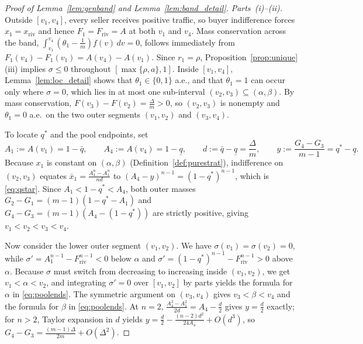 \documentclass[12pt]{article}
\theoremstyle{mystyle}
\theoremstyle{mystyle2}
\newcommand{\1}{\mathbf{1}}
\begin{document}
\begin{proof}[Proof of Lemma~\ref{lem:genband} and Lemma~\ref{lem:band_detail}]
\emph{Parts~(i)--(ii).} Outside $[v_1,v_4]$, every seller receives positive traffic, so buyer indifference forces $x_1=x_{\mathrm{riv}}$ and hence $F_1=F_{\mathrm{riv}}=A$ at both $v_1$ and $v_4$. Mass conservation across the band, $\int_{v_1}^{v_4}(\theta_1-\frac{1}{m})f(v)\,dv=0$, follows immediately from $F_1(v_4)-F_1(v_1)=A(v_4)-A(v_1)$. Since $r_1=\rho$, Proposition~\ref{prop:unique}(iii) implies $\sigma\le 0$ throughout $[\max\{\rho,a\},1]$. Inside $[v_1,v_4]$, Lemma~\ref{lem:loc_detail} shows that $\theta_1\in\{0,1\}$ a.e., and that $\theta_1=1$ can occur only where $\sigma=0$, which lies in at most one sub-interval $(v_2,v_3)\subseteq(\alpha,\beta)$. By mass conservation, $F(v_3)-F(v_2)=\frac{\Delta}{m}>0$, so $(v_2,v_3)$ is nonempty and $\theta_1=0$ a.e.\ on the two outer segments $(v_1,v_2)$ and $(v_3,v_4)$.

To locate $q^*$ and the pool endpoints, set
\[
A_1 := A(v_1) = 1-\bar q, \qquad A_4 := A(v_4) = 1-\underline q, \qquad d := \bar q-\underline q = \frac{\Delta}{m}, \qquad y := \frac{G_4-G_3}{m-1} = q^*-\underline q.
\]
Because $x_1$ is constant on $(\alpha,\beta)$ (Definition~\ref{def:purestrat}), indifference on $(v_2,v_3)$ equates $\bar x_1=\frac{A_4^n-A_1^n}{nd}$ to $(A_4-y)^{n-1}=(1-q^*)^{n-1}$, which is \eqref{eq:qstar}. Since $A_1<1-q^*<A_4$, both outer masses $G_2-G_1=(m-1)(1-q^*-A_1)$ and $G_4-G_3=(m-1)(A_4-(1-q^*))$ are strictly positive, giving $v_1<v_2<v_3<v_4$.

Now consider the lower outer segment $(v_1,v_2)$. We have $\sigma(v_1)=\sigma(v_2)=0$, while $\sigma'=A_1^{n-1}-F_{\mathrm{riv}}^{n-1}<0$ below $\alpha$ and $\sigma'=(1-q^*)^{n-1}-F_{\mathrm{riv}}^{n-1}>0$ above $\alpha$. Because $\sigma$ must switch from decreasing to increasing inside $(v_1,v_2)$, we get $v_1<\alpha<v_2$, and integrating $\sigma'=0$ over $[v_1,v_2]$ by parts yields the formula for $\alpha$ in \eqref{eq:poolends}. The symmetric argument on $(v_3,v_4)$ gives $v_3<\beta<v_4$ and the formula for $\beta$ in \eqref{eq:poolends}. At $n=2$, $\frac{A_4^2-A_1^2}{2d}=A_4-\frac{d}{2}$ gives $y=\frac{d}{2}$ exactly; for $n>2$, Taylor expansion in $d$ yields $y=\frac{d}{2}-\frac{(n-2)d^2}{24A_4}+O(d^3)$, so $G_4-G_3=\frac{(m-1)\Delta}{2m}+O(\Delta^2)$.


\end{proof}
\end{document}
